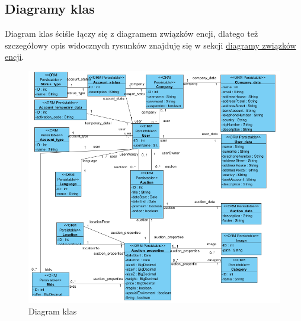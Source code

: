 \documentclass[10pt,titlepage]{article} %
\begin{document}
\subsection{Diagramy klas}
Diagram klas ściśle łączy się z diagramem związków encji, dlatego też szczegółowy opis widocznych rysunków znajduję się w sekcji \hyperref[Diagramy związków encji]{diagramy związków encji}.
\begin{figure}[H]
\includegraphics[width=\textwidth]{img/sekcja2/diagramKlas}
\caption[Diagram klas]{Diagram klas}
\end{figure}

\newpage
\end{document}
